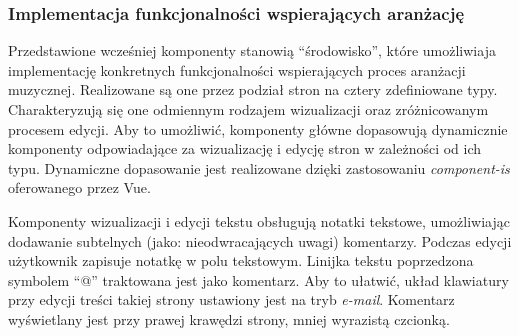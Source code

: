 \subsubsection{Implementacja funkcjonalności wspierających aranżację}
Przedstawione wcześniej komponenty stanowią \enquote{środowisko}, które umożliwiaja implementację konkretnych funkcjonalności
wspierających proces aranżacji muzycznej. Realizowane są one przez podział stron na cztery zdefiniowane typy.
Charakteryzują się one odmiennym rodzajem wizualizacji oraz zróżnicowanym procesem edycji. Aby to umożliwić, komponenty główne
dopasowują dynamicznie komponenty odpowiadające za wizualizację i edycję stron w zależności od ich typu.
Dynamiczne dopasowanie jest realizowane dzięki zastosowaniu \textit{component-is} oferowanego przez Vue.

Komponenty wizualizacji i edycji tekstu obsługują notatki tekstowe, umożliwiając dodawanie subtelnych (jako: nieodwracających uwagi)
komentarzy. Podczas edycji użytkownik zapisuje notatkę w polu tekstowym. Linijka tekstu poprzedzona symbolem \enquote{@} traktowana jest
jako komentarz. Aby to ułatwić, układ klawiatury przy edycji treści takiej strony ustawiony jest na tryb \textit{e-mail}.
Komentarz wyświetlany jest przy prawej krawędzi strony, mniej wyrazistą czcionką.
